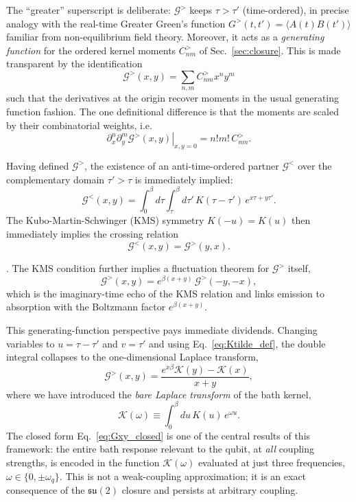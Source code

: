 The ``greater'' superscript is deliberate: $\mathcal{G}^>$ keeps
$\tau>\tau'$ (time-ordered), in precise analogy with the real-time Greater
Green's function $G^>(t,t')=\langle A(t)B(t')\rangle$ familiar from
non-equilibrium field theory. Moreover, it acts as a \emph{generating function} for the ordered kernel moments $C^>_{nm}$ of Sec.~\ref{sec:closure}. This is made transparent by the identification
\begin{equation}
\mathcal{G}^>(x,y) = \sum_{n,m} C^>_{nm} x^n y^m
\end{equation}
such that the derivatives at the origin recover moments in the usual generating function fashion. The one definitional difference is that the moments are scaled by their combinatorial weights, i.e.
\begin{equation}
\partial_x^n \partial_y^m \left.\mathcal{G}^>(x,y)\right|_{x,y=0} = n!m!\, C^>_{nm}.
\end{equation} 

Having defined $\mathcal{G}^>$, the existence of an anti-time-ordered partner $\mathcal{G}^<$ over the complementary domain $\tau'>\tau$ is immediately implied:
\begin{equation}
    \mathcal{G}^<(x,y)
    =
    \int_0^\beta d\tau \int_\tau^\beta d\tau'\,
    K(\tau-\tau')\,e^{x\tau+y\tau'}.
    \label{eq:Gxy_lesser_def}
\end{equation}
The Kubo-Martin-Schwinger (KMS) symmetry $K(-u)=K(u)$ then immediately implies the crossing relation
\begin{equation}
    \mathcal{G}^<(x,y)=\mathcal{G}^>(y,x).
\end{equation}


.  The KMS condition further implies a
fluctuation theorem for $\mathcal{G}^>$ itself,
\begin{equation}
    \mathcal{G}^>(x,y) = e^{\beta(x+y)}\,\mathcal{G}^>(-y,-x),
    \label{eq:KMS_Gxy}
\end{equation}
which is the imaginary-time echo of the KMS relation and links
emission to absorption with the Boltzmann factor $e^{\beta(x+y)}$.

This generating-function perspective pays immediate dividends. Changing variables
to $u=\tau-\tau'$ and $v=\tau'$ and using Eq.~\eqref{eq:Ktilde_def}, the double
integral collapses to the one-dimensional Laplace transform,
\begin{equation}
    \mathcal{G}^>(x,y) = \frac{e^{x\beta}\mathcal{K}(y) - \mathcal{K}(x)}{x+y},
    \label{eq:Gxy_closed}
\end{equation}
where we have introduced the \emph{bare Laplace transform} of the bath kernel,
\begin{equation}
    \mathcal{K}(\omega) \equiv \int_0^\beta du\, K(u)\,e^{\omega u}.
    \label{eq:Ktilde_def}
\end{equation}
The closed form Eq.~\eqref{eq:Gxy_closed} is one of the central results of this
framework: the entire bath response relevant to the qubit, at \emph{all} coupling
strengths, is encoded in the function $\mathcal{K}(\omega)$ evaluated at just
three frequencies, $\omega\in\{0,\pm\omega_q\}$.  This is not a weak-coupling
approximation; it is an exact consequence of the $\mathfrak{su}(2)$ closure and
persists at arbitrary coupling.

